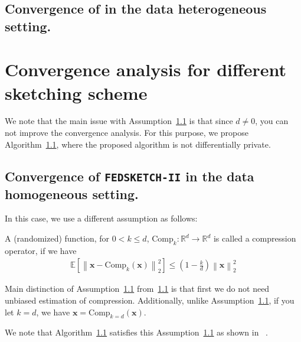 

\subsection{Convergence of  \texttt{} in the data heterogeneous setting.} 
\section{Convergence analysis for different sketching scheme}
We note that the main issue with Assumption~\ref{} is that since $d\neq 0$, you can not improve the convergence analysis. For this purpose, we propose Algorithm~\ref{}, where the proposed algorithm is not differentially private.

\subsection{Convergence of \texttt{FEDSKETCH-II} in the data homogeneous setting.} 
In this case, we use a different assumption as follows:
\begin{assumption}\label{Assu:2.5}
A (randomized) function, for $0<k\leq d$, $\text{Comp}_k:\mathbb{R}^{d}\rightarrow\mathbb{R}^{d}$ is called a compression operator, if we have 
\begin{align}
    \mathbb{E}\left[\left\|\boldsymbol{x}-\text{Comp}_k(\boldsymbol{x})\right\|^2_2\right]\leq \left(1-\frac{k}{d}\right)\left\|\boldsymbol{x}\right\|^2_2
\end{align}
\end{assumption}
\begin{remark}
Main distinction of Assumption~\ref{} from~\ref{} is that first we do not need unbiased estimation of compression. Additionally, unlike Assumption~\ref{}, if you let $k=d$, we have $\boldsymbol{x}=\text{Comp}_{k=d}(\boldsymbol{x})$.    
\end{remark}

We note that Algorithm~\ref{} satisfies this Assumption~\ref{} as shown in ~\cite{ivkin2019communication}.

